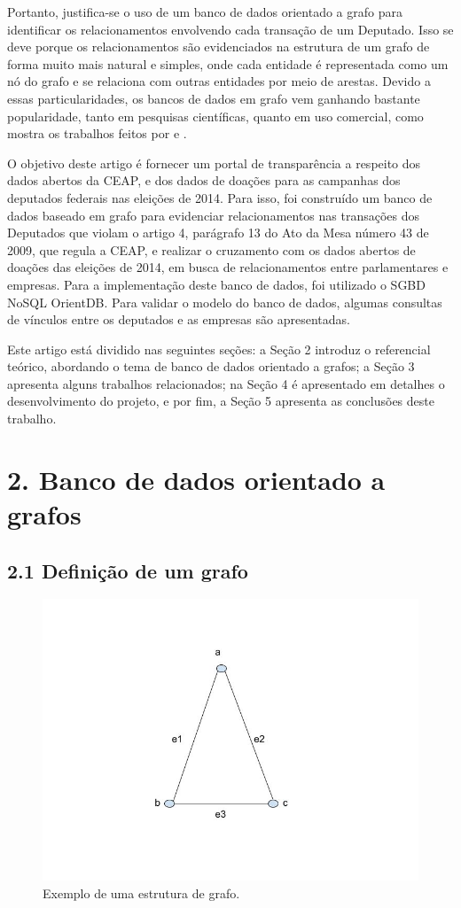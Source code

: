\documentclass[12pt]{article}
\begin{document}
	Portanto, justifica-se o uso de um banco de dados orientado a grafo para identificar os relacionamentos envolvendo cada transação de um Deputado. Isso se deve porque os
relacionamentos são evidenciados na estrutura de um grafo de forma muito mais natural
e simples, onde cada entidade é representada como um nó do grafo e se relaciona com
outras entidades por meio de arestas. Devido a essas particularidades, os bancos de dados
em grafo vem ganhando bastante popularidade, tanto em pesquisas científicas, quanto em uso comercial, como mostra os trabalhos feitos por \cite{noble2003graph} e \cite{chau2005fraud}.

	O objetivo deste artigo é fornecer um portal de transparência a respeito dos dados abertos da CEAP, e dos dados de doações para as campanhas dos deputados federais nas eleições de 2014. Para isso, foi construído um banco de dados baseado em grafo para evidenciar relacionamentos nas transações dos Deputados que violam o artigo 4, parágrafo 13 do Ato da Mesa
número 43 de 2009, que regula a CEAP, e realizar o cruzamento com os dados abertos de doações das eleições de 2014, em busca de relacionamentos entre parlamentares e empresas. Para a implementação deste banco de dados, foi utilizado o SGBD NoSQL OrientDB. Para validar o modelo do banco de dados, algumas consultas de vínculos entre os deputados e as empresas são apresentadas.

	Este artigo está dividido nas seguintes seções: a Seção 2 introduz o referencial teórico, abordando o tema de banco de dados orientado a grafos; a Seção 3 apresenta alguns trabalhos relacionados; na Seção 4 é apresentado em detalhes o desenvolvimento do projeto, e por fim, a Seção 5 apresenta as conclusões deste trabalho.
	
\section{2. Banco de dados orientado a grafos} \label{sec:contribuicoes}

\subsection{2.1 Definição de um grafo} \label{sec:grafodef}

\begin{figure}[!ht]
\centering
\includegraphics[width=.5\textwidth]{simple_graph}
\caption{Exemplo de uma estrutura de grafo.}
\label{graph_definition}
\end{figure}
\end{document}
